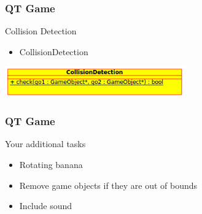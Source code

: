 \begin{frame}[fragile]
\frametitle{QT Game}
Collision Detection
\begin{itemize}
\item CollisionDetection
\end{itemize}
\includegraphics[width=220pt]{img/qtgame_cdcd.png}
\end{frame}

\begin{frame}[fragile]
\frametitle{QT Game}
Your additional tasks
\begin{itemize}
\item Rotating banana
\item Remove game objects if they are out of bounds
\item Include sound
\end{itemize}
\end{frame}



